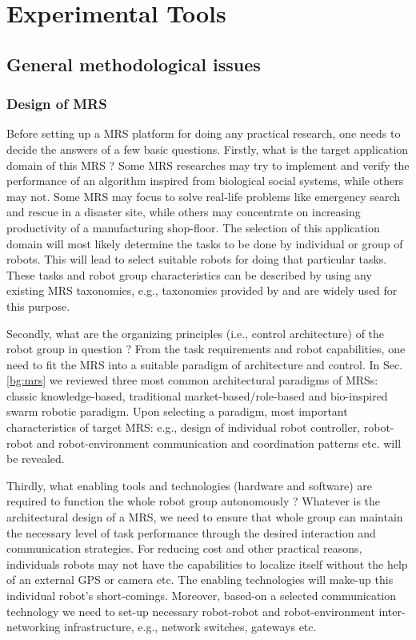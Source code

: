 \chapter{Experimental Tools}
\section{General methodological issues}
\subsection{Design of MRS}
\label{expt-tools:mrs-design}
Before setting up a MRS platform for doing any practical research, one needs to decide the answers of  a few basic questions. 
Firstly, what  is the target application domain of this MRS ? Some MRS researches may try to implement and verify the performance of an algorithm inspired from biological social systems, while others may not. Some MRS may focus to solve real-life problems like emergency search and rescue in a disaster site, while others may concentrate on increasing productivity of a manufacturing shop-floor.  The selection of this application domain will most likely determine the tasks to be done by individual or group of robots. This will lead to select suitable robots for doing that particular tasks. These tasks and robot group characteristics can be described by using any existing MRS taxonomies, e.g.,  taxonomies provided by   \cite{Gerkey+2004} and \cite{Dudek+1996} are widely used for this purpose. 

Secondly,  what are the organizing principles (i.e., control architecture) of  the robot group in question ? From the task requirements and robot capabilities,  one need to fit the MRS into a suitable paradigm of architecture and control. In Sec. \ref{bg:mrs} we reviewed three most common architectural paradigms of MRSs: classic knowledge-based, traditional market-based/role-based and bio-inspired swarm robotic paradigm. Upon selecting a paradigm, most important characteristics of target MRS: e.g., design of individual robot controller, robot-robot and robot-environment communication and coordination patterns etc. will be revealed.

Thirdly, what enabling tools and technologies (hardware and software) are required to function the whole robot group autonomously ? Whatever is the architectural design of a MRS, we need to ensure that whole group can maintain the necessary level of task performance through the desired interaction and communication strategies. For reducing cost and other practical reasons, individuals robots may not have the capabilities to localize itself without the help of an external GPS or camera etc. The enabling technologies will make-up this individual robot's short-comings. Moreover, based-on a selected communication technology we need to set-up necessary robot-robot and robot-environment inter-networking infrastructure, e.g., network switches, gateways etc.

